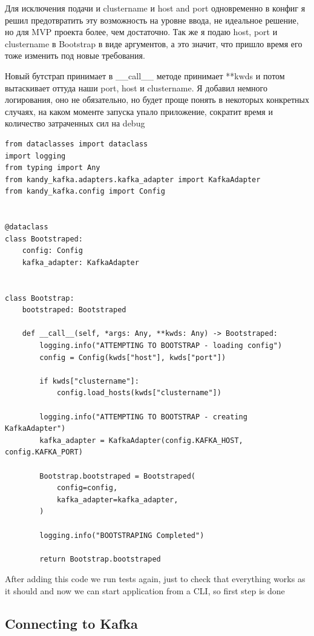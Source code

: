 \documentclass[10pt , a4paper]{report}
\newenvironment{code}{\captionsetup{type=listing}}{}
\begin{document}
Для исключения подачи и clustername и host and port одновременно в конфиг я решил предотвратить эту возможность на уровне ввода, не идеальное решение, но для MVP проекта более, чем достаточно. Так же я подаю host, port и clustername в Bootstrap в виде аргументов, а это значит, что пришло время его тоже изменить под новые требования.

Новый бутстрап принимает в \_\_call\_\_ методе принимает **kwds и потом вытаскивает оттуда наши port, host и clustername. Я добавил немного логирования, оно не обязательно, но будет проще понять в некоторых конкретных случаях, на каком моменте запуска упало приложение, сократит время и количество затраченных сил на debug

\begin{code}
  \begin{verbatim}
from dataclasses import dataclass
import logging
from typing import Any
from kandy_kafka.adapters.kafka_adapter import KafkaAdapter
from kandy_kafka.config import Config


@dataclass
class Bootstraped:
    config: Config
    kafka_adapter: KafkaAdapter


class Bootstrap:
    bootstraped: Bootstraped

    def __call__(self, *args: Any, **kwds: Any) -> Bootstraped:
        logging.info("ATTEMPTING TO BOOTSTRAP - loading config")
        config = Config(kwds["host"], kwds["port"])

        if kwds["clustername"]:
            config.load_hosts(kwds["clustername"])

        logging.info("ATTEMPTING TO BOOTSTRAP - creating KafkaAdapter")
        kafka_adapter = KafkaAdapter(config.KAFKA_HOST, config.KAFKA_PORT)

        Bootstrap.bootstraped = Bootstraped(
            config=config,
            kafka_adapter=kafka_adapter,
        )

        logging.info("BOOTSTRAPING Completed")

        return Bootstrap.bootstraped
  \end{verbatim}
\end{code}

After adding this code we run tests again, just to check that everything works as it should and now we can start application from a CLI, so first step is done

\subsection{Connecting to Kafka}
\end{document}
